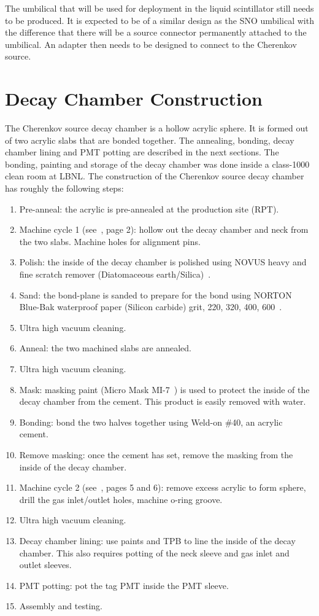 The umbilical that will be used for deployment in the liquid scintillator still needs to be produced. 
It is expected to be of a similar design as the SNO \Li umbilical with the difference that there will be a source connector permanently attached to the umbilical. 
An adapter then needs to be designed to connect to the Cherenkov source. 

\section{Decay Chamber Construction}
\label{chap:construction}

The Cherenkov source decay chamber is a hollow acrylic sphere.
It is formed out of two acrylic slabs that are bonded together.
The annealing, bonding, decay chamber lining and PMT potting are described in the next sections.
The bonding, painting and storage of the decay chamber was done inside a class-1000 clean room at LBNL.
The construction of the Cherenkov source decay chamber has roughly the following steps:

\begin{enumerate}
    \item Pre-anneal: the acrylic is pre-annealed at the production site (RPT).
    \item Machine cycle 1 (see~\cite{wallig:2015}, page 2): hollow out the decay chamber and neck from the two slabs. Machine holes for alignment pins. 
    \item Polish: the inside of the decay chamber is polished using NOVUS heavy and fine scratch remover (Diatomaceous earth/Silica)~\cite{polish}. 
    \item Sand: the bond-plane is sanded to prepare for the bond using NORTON Blue-Bak waterproof paper (Silicon carbide) grit, 220, 320, 400, 600~\cite{sand}.
    \item Ultra high vacuum cleaning.
    \item Anneal: the two machined slabs are annealed.
    \item Ultra high vacuum cleaning.
    \item Mask: masking paint (Micro Mask MI-7~\cite{masking}) is used to protect the inside of the decay chamber from the cement. This product is easily removed with water.
    \item Bonding: bond the two halves together using Weld-on \#40, an acrylic cement. 
    \item Remove masking: once the cement has set, remove the masking from the inside of the decay chamber.
    \item Machine cycle 2 (see~\cite{wallig:2015}, pages 5 and 6): remove excess acrylic to form sphere, drill the gas inlet/outlet holes, machine o-ring groove.
    \item Ultra high vacuum cleaning.
    \item Decay chamber lining: use paints and TPB to line the inside of the decay chamber. This also requires potting of the neck sleeve and gas inlet and outlet sleeves.
    \item PMT potting: pot the tag PMT inside the PMT sleeve.
    \item Assembly and testing.
\end{enumerate}

